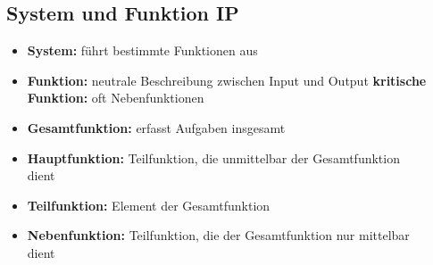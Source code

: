 \subsection{System und Funktion \hfill IP}
\begin{scriptsize}
    \begin{itemize}
        \item \textbf{System:} führt bestimmte Funktionen aus
        \item \textbf{Funktion:} neutrale Beschreibung zwischen Input und Output
        \subitem \textbf{kritische Funktion:} oft Nebenfunktionen
        \item \textbf{Gesamtfunktion:} erfasst Aufgaben insgesamt
        \item \textbf{Hauptfunktion:} Teilfunktion, die unmittelbar der Gesamtfunktion \\dient
        \item \textbf{Teilfunktion:} Element der Gesamtfunktion
        \item \textbf{Nebenfunktion:} Teilfunktion, die der Gesamtfunktion nur mittelbar \\dient 
    \end{itemize}
\end{scriptsize}
